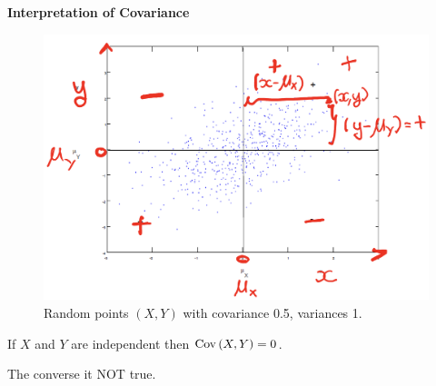 \textbf{Interpretation of Covariance}

\begin{figure}[htbp]
    \center
    \includegraphics[scale=0.5]{img/cov.png}
    \caption{Random points $(X,Y)$ with covariance 0.5, variances 1.}
\end{figure}


\begin{theorem}
    If $X$ and $Y$ are independent then $\operatorname{Cov}\left({X, Y}\right) = 0$.
\end{theorem}

\begin{note}
    The converse it NOT true.
\end{note}



